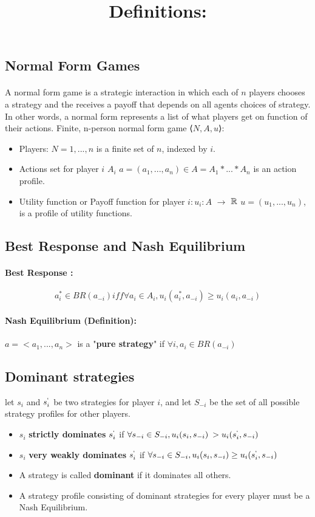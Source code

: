\subsection{Normal Form Games}
\paragraph{}A normal form game is a strategic interaction in which each of $n$ players chooses a strategy and the receives a payoff that depends on all agents choices of strategy. In other words, a normal form represents a list of what players get on function of their actions.
Finite, n-person normal form game  ⟨$N, A, u$⟩:
\begin{itemize}
\item Players: $ N = {1, ... , n} $ is a finite set of $n$, indexed by $i$.
\item Actions set for player $i$ $A_i$
\subitem $a = (a_1,...,a_n) \in A = A_1 * ... * A_n $ is an action profile.
\item Utility function or Payoff function for player $i: u_i : A $  $\to$ ${\Bbb{R}}$
\subitem $u = (u_1,..., u_n)$, is a profile of utility functions.
\end{itemize}

\subsection{Best Response and Nash Equilibrium}\label{subsection}
\paragraph{Best Response :}
\begin{equation}\label{eq:1}
 a_i^* \in BR(a_{-i})  iff   \forall a_i \in A_i, u_i(a_i^*,a_{-i}) \geq u_i(a_i, a_{-i})
\end{equation}
 
\paragraph{Nash Equilibrium (Definition):}
$a = <a_1,...,a_n>$ is a "\textbf{pure strategy}" if $\forall i, a_i \in BR(a_{-i})$

\subsection{Dominant strategies}
let $s_i$ and $s_i^`$ be two strategies for player $i$, and let $S_{-i}$ be the set of all possible strategy profiles for other players.
\bigbreak
\title{\textbf{Definitions:} }
\begin{itemize}
\item $s_i$ \textbf{strictly dominates} $s_i^`$ if $\forall s_{-i} \in S_{-i}, u_i(s_i, s_{-i}) \>> u_i(s_i^`, s_{-i})$
\item $s_i$ \textbf{very weakly dominates} $s_i^`$ if $\forall s_{-i} \in S_{-i}, u_i(s_i, s_{-i}) \geq u_i(s_i^`, s_{-i})$
\item A strategy is called \textbf{dominant} if it dominates all others.
\item A strategy profile consisting of dominant strategies for every player must be a Nash Equilibrium.
\end{itemize}

